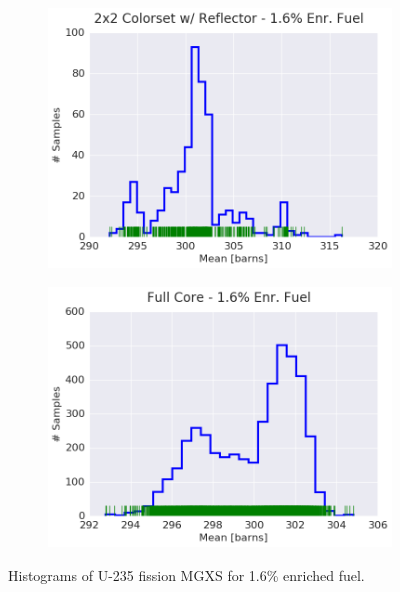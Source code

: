 \begin{figure}[h!]
\begin{subfigure}{0.5\textwidth}
  \includegraphics[width=\linewidth]{figures/patterns/reflector/hist-kde-rug/16-enr-fiss-2}  \caption{}
  \label{fig:chap9-hist-reflector-1.6-fiss}
\end{subfigure}%
\begin{subfigure}{0.5\textwidth}
  \centering
  \includegraphics[width=\linewidth]{figures/patterns/full-core/hist-kde-rug/16-enr-fiss-2} \caption{}
  \label{fig:chap9-hist-full-core-1.6-fiss}
\end{subfigure}
\caption[Histogram of U-235 fission MGXS for 1.6\% enriched fuel]{Histograms of U-235 fission \ac{MGXS} for 1.6\% enriched fuel.}
\label{fig:chap9-hist-1.6-fiss}
\end{figure}

